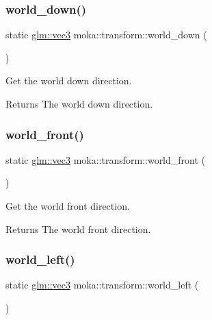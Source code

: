 \subsubsection{\texorpdfstring{world\_down()}{world\_down()}}
{\footnotesize\ttfamily static \mbox{\hyperlink{namespacemoka_aed2224bc0e5b79e57a8975ded94ee1aaa97ade28e93c0de60adc075bdbe07ca36}{glm\+::vec3}} moka\+::transform\+::world\+\_\+down (\begin{DoxyParamCaption}{ }\end{DoxyParamCaption})\hspace{0.3cm}{\ttfamily [static]}}



Get the world down direction. 

\begin{DoxyReturn}{Returns}
The world down direction. 
\end{DoxyReturn}
\mbox{\label{classmoka_1_1transform_a4212585d4bde3be8fcf6d80122d8514d}} 
\subsubsection{\texorpdfstring{world\_front()}{world\_front()}}
{\footnotesize\ttfamily static \mbox{\hyperlink{namespacemoka_aed2224bc0e5b79e57a8975ded94ee1aaa97ade28e93c0de60adc075bdbe07ca36}{glm\+::vec3}} moka\+::transform\+::world\+\_\+front (\begin{DoxyParamCaption}{ }\end{DoxyParamCaption})\hspace{0.3cm}{\ttfamily [static]}}



Get the world front direction. 

\begin{DoxyReturn}{Returns}
The world front direction. 
\end{DoxyReturn}
\mbox{\label{classmoka_1_1transform_a510f66a2be7fc5194417ed82262842c2}} 
\subsubsection{\texorpdfstring{world\_left()}{world\_left()}}
{\footnotesize\ttfamily static \mbox{\hyperlink{namespacemoka_aed2224bc0e5b79e57a8975ded94ee1aaa97ade28e93c0de60adc075bdbe07ca36}{glm\+::vec3}} moka\+::transform\+::world\+\_\+left (\begin{DoxyParamCaption}{ }\end{DoxyParamCaption})\hspace{0.3cm}{\ttfamily [static]}}



